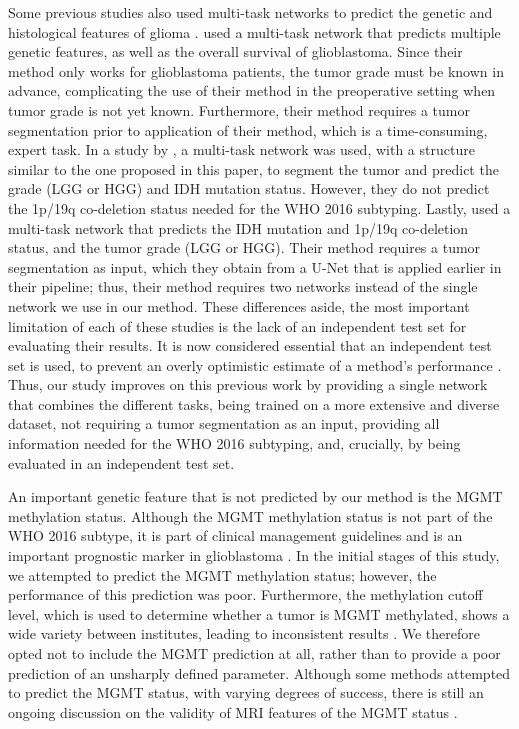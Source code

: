 Some previous studies also used multi-task networks to predict the genetic and histological features of glioma \autocite{tang2020multi, xue2020radiomicsmulti, decuyper2020automated}.
 used a multi-task network that predicts multiple genetic features, as well as the overall survival of glioblastoma.
Since their method only works for glioblastoma patients, the \gls{tumor} grade must be known in advance, complicating the use of their method in the preoperative setting when \gls{tumor} grade is not yet known.
Furthermore, their method requires a \gls{tumor} segmentation prior to application of their method, which is a time-consuming, expert task.
In a study by , a multi-task network was used, with a structure similar to the one proposed in this paper, to segment the \gls{tumor} and predict the grade (\gls{LGG} or \gls{HGG}) and \gls{IDH} mutation status.
However, they do not predict the 1p/19q co-deletion status needed for the \gls{WHO} 2016 subtyping.
Lastly,  used a multi-task network that predicts the \gls{IDH} mutation and 1p/19q co-deletion status, and the \gls{tumor} grade (\gls{LGG} or \gls{HGG}).
Their method requires a \gls{tumor} segmentation as input, which they obtain from a U-Net that is applied earlier in their pipeline; thus, their method requires two networks instead of the single network we use in our method.
These differences aside, the most important limitation of each of these studies is the lack of an independent test set for evaluating their results.
It is now considered essential that an independent test set is used, to prevent an overly optimistic estimate of a method's performance \autocite{gillies2016radiomics, rizzo2018radiomics, lohmann2020radiomics, yip2016applications}.
Thus, our study improves on this previous work by providing a single network that combines the different tasks, being trained on a more extensive and diverse dataset, not requiring a \gls{tumor} segmentation as an input, providing all information needed for the \gls{WHO} 2016 subtyping, and, crucially, by being evaluated in an independent test set.

An important genetic feature that is not predicted by our method is the \gls{MGMT} methylation status.
Although the \gls{MGMT} methylation status is not part of the \gls{WHO} 2016 subtype, it is part of clinical management guidelines and is an important prognostic marker in glioblastoma \autocite{louis20162016}.
In the initial stages of this study, we attempted to predict the \gls{MGMT} methylation status; however, the performance of this prediction was poor.
Furthermore, the methylation cutoff level, which is used to determine whether a \gls{tumor} is \gls{MGMT} methylated, shows a wide variety between institutes, leading to inconsistent results  \autocite{malstrom2019MGMT}.
We therefore opted not to include the \gls{MGMT} prediction at all, rather than to provide a poor prediction of an unsharply defined parameter.
Although some methods attempted to predict the \gls{MGMT} status, with varying degrees of success, there is still an ongoing discussion on the validity of \gls{MRI} features of the \gls{MGMT} status \autocite{tang2020multi, sasaki2019mgmt, gupta2013dwimgmt, carrillo2012mgmt, mikkelsen2020MGMT}.

